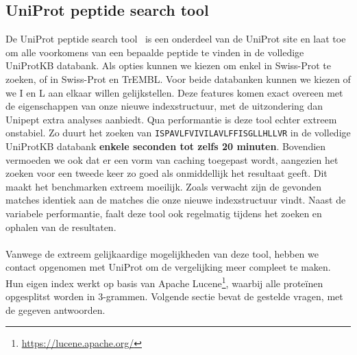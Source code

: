 \subsection{UniProt peptide search tool}
De UniProt peptide search tool~\cite{uniprot_search_paper, uniprot_search_site} is een onderdeel van de UniProt site en laat toe om alle voorkomens van een bepaalde peptide te vinden in de volledige UniProtKB databank.
Als opties kunnen we kiezen om enkel in Swiss-Prot te zoeken, of in Swiss-Prot en TrEMBL\@.
Voor beide databanken kunnen we kiezen of we I en L aan elkaar willen gelijkstellen.
Deze features komen exact overeen met de eigenschappen van onze nieuwe indexstructuur, met de uitzondering dan Unipept extra analyses aanbiedt.
Qua performantie is deze tool echter extreem onstabiel.
Zo duurt het zoeken van \texttt{ISPAVLFVIVILAVLFFISGLLHLLVR} in de volledige UniProtKB databank \textbf{enkele seconden tot zelfs 20 minuten}.
Bovendien vermoeden we ook dat er een vorm van caching toegepast wordt, aangezien het zoeken voor een tweede keer zo goed als onmiddellijk het resultaat geeft.
Dit maakt het benchmarken extreem moeilijk.
Zoals verwacht zijn de gevonden matches identiek aan de matches die onze nieuwe indexstructuur vindt.
Naast de variabele performantie, faalt deze tool ook regelmatig tijdens het zoeken en ophalen van de resultaten.
\\ \\
Vanwege de extreem gelijkaardige mogelijkheden van deze tool, hebben we contact opgenomen met UniProt om de vergelijking meer compleet te maken.
Hun eigen index werkt op basis van Apache Lucene\footnote{\url{https://lucene.apache.org/}}, waarbij alle proteïnen opgesplitst worden in 3-grammen.
Volgende sectie bevat de gestelde vragen, met de gegeven antwoorden.

